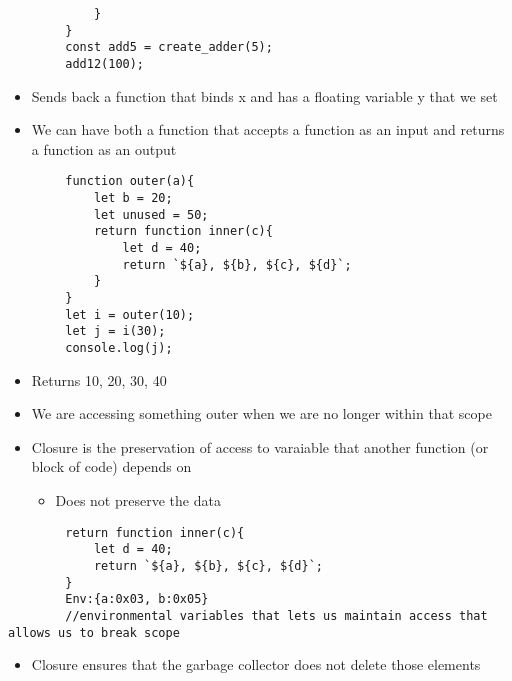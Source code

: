 \documentclass{article}
\begin{document}
\begin{itemize}
\begin{lstlisting}
            }
        }
        const add5 = create_adder(5);
        add12(100);
    \end{lstlisting}
    \begin{itemize}
        \item Sends back a function that binds x and has a floating variable y that we set
        \item We can have both a function that accepts a function as an input and returns a function as an output
    \end{itemize}
    \begin{lstlisting}
        function outer(a){
            let b = 20;
            let unused = 50;
            return function inner(c){
                let d = 40;
                return `${a}, ${b}, ${c}, ${d}`;
            }
        }
        let i = outer(10);
        let j = i(30);
        console.log(j);
    \end{lstlisting}
    \begin{itemize}
        \item Returns 10, 20, 30, 40
        \item We are accessing something outer when we are no longer within that scope
        \item Closure is the preservation of access to varaiable that another function (or block of code) depends on 
        \begin{itemize}
            \item Does not preserve the data
        \end{itemize}
    \end{itemize}
    \begin{lstlisting}
        return function inner(c){
            let d = 40;
            return `${a}, ${b}, ${c}, ${d}`;
        }
        Env:{a:0x03, b:0x05}
        //environmental variables that lets us maintain access that allows us to break scope
    \end{lstlisting}
    \begin{itemize}
        \item Closure ensures that the garbage collector does not delete those elements 
    \end{itemize}
\end{itemize}
\end{document}
